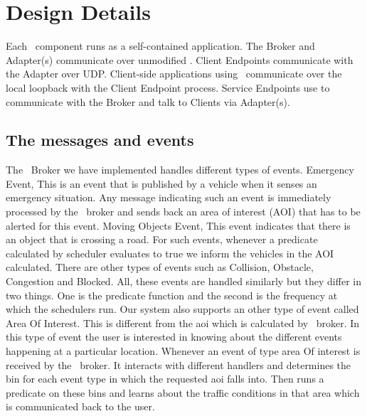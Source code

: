 \section{Design Details}
\label{sec:design-details}

Each \name~component runs as a self-contained application. The
Broker and Adapter(s) communicate over unmodified \pubsub. Client
Endpoints communicate with the Adapter over UDP. Client-side
applications using \name~communicate over the local loopback with
the Client Endpoint process. Service Endpoints use \pubsub to
communicate with the Broker and talk to Clients via
Adapter(s).

\subsection{The messages and events}

The \name~Broker we have implemented handles different types of events. 
Emergency Event, This is an event that is published by a vehicle when it senses
an emergency situation. Any message indicating such an event is immediately 
processed by the \name~broker and sends back an area of interest (AOI)
that has to be alerted for this event.
Moving Objects Event, This event indicates that there is an object that is 
crossing a road. For such events, whenever a predicate calculated by scheduler 
evaluates to true we inform the vehicles in the AOI calculated.
There are other types of events such as Collision, Obstacle, Congestion and 
Blocked. All, these events are handled similarly but they differ in two things.
One is the predicate function and the second is the frequency at which the 
schedulers run. Our system also supports an other type of event called 
Area Of Interest. This is different from the aoi which is calculated by
\name~broker. In this type of event the user is interested in knowing about 
the different events happening at a particular location. Whenever an event of 
type area Of interest is received by the \name~broker. It interacts with 
different handlers and determines the bin for each event type in which the 
requested aoi falls into. Then runs a predicate on these bins and learns about 
the traffic conditions in that area which is communicated back to the user.

